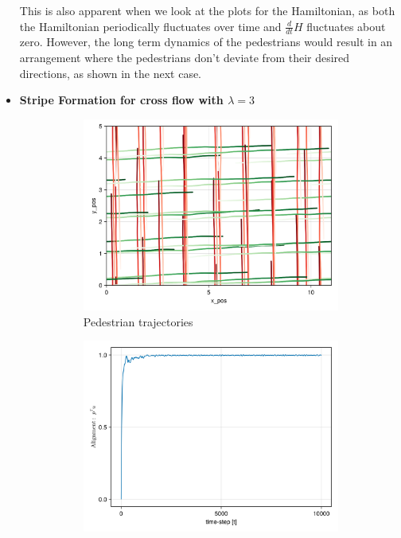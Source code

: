 \begin{itemize}
This is also apparent when we look at the plots for the Hamiltonian, as both the Hamiltonian periodically fluctuates over time and $\frac{d}{dt}H$ fluctuates about zero. However, the long term dynamics of the pedestrians would result in an arrangement where the pedestrians don't deviate from their desired directions, as shown in the next case.

    \item \textbf{Stripe Formation for cross flow with $\lambda = 3$}
    \begin{figure}[H]
        \centering
        \begin{subfigure}{0.49\textwidth}
            \centering
            \includegraphics[width=\linewidth]{figures/ch5_collective/s0crossleap3flow_10000.png}
            \caption{Pedestrian trajectories}
            \label{plot:cross3_traj}
        \end{subfigure}
        \begin{subfigure}{.49\textwidth}
            \centering
            \includegraphics[width=\linewidth]{figures/ch5_collective/straight_cross3.png}

\end{subfigure}
\end{figure}
\end{itemize}
